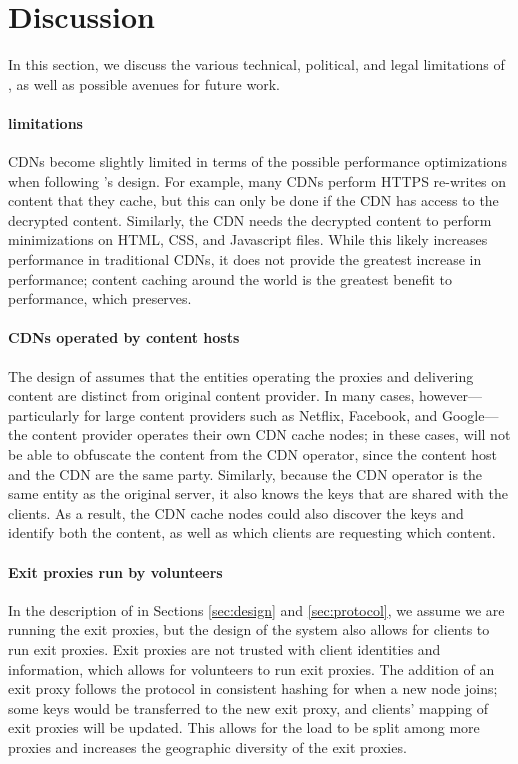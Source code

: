\section{Discussion}
\label{sec:discussion}

In this section, we discuss the various technical, political, and legal limitations
of \system{}, as well as possible avenues for future work. 

\paragraph{\system{} limitations} CDNs become slightly limited in terms of the 
possible performance optimizations when following \system{}'s design.  For example, 
many CDNs perform HTTPS re-writes on content that they cache, but this can only be 
done if the CDN has access to the decrypted content.  Similarly, the CDN needs the 
decrypted content to perform minimizations on HTML, CSS, and Javascript files.  While 
this likely increases performance in traditional CDNs, it does not provide the greatest 
increase in performance; content caching around the world is the greatest benefit to 
performance, which \system{} preserves.

\paragraph{CDNs operated by content hosts} The design of \system{}
assumes that the entities operating the proxies and delivering content are
distinct from original content provider. In many cases, however---particularly
for large content providers such as Netflix, Facebook, and Google---the
content provider operates their own CDN cache nodes; in these cases, \system{} will
not be able to obfuscate the content from the CDN operator, since the content host
and the CDN are the same party.  Similarly, because the CDN operator is the same
entity as the original server, it also knows the keys that are shared with the clients.
As a result, the CDN cache nodes could also discover the keys and identify both
the content, as well as which clients are requesting which content.

\paragraph{Exit proxies run by volunteers} In the description of \system{} in Sections 
\ref{sec:design} and \ref{sec:protocol}, we assume we are running the exit proxies, but 
the design of the system also allows for clients to run exit proxies.  Exit proxies are not 
trusted with client identities and information, which allows for volunteers to run exit proxies.  
The addition of an exit proxy follows the protocol in consistent hashing for when a new node 
joins; some keys would be transferred to the new exit proxy, and clients' mapping of 
exit proxies will be updated.  This allows for the load to be split among more proxies and 
increases the geographic diversity of the exit proxies.


